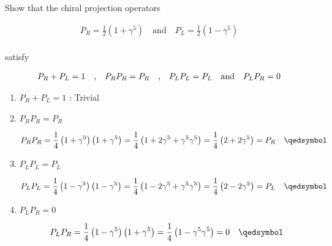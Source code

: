 
\begin{problem}{6.2}
    Show that the chiral projection operators 

    \begin{align*}
        P_R = \frac{1}{2}\left(1+\gamma^5\right) \quad \text{and} \quad P_L = \frac{1}{2}\left(1-\gamma^5\right)
    \end{align*}\\
    satisfy 

    \begin{align*}
        P_R + P_L = 1 \quad \text{,} \quad P_R P_R = P_R \quad \text{,} \quad P_L P_L = P_L \quad \text{and} \quad P_LP_R = 0 \\
    \end{align*}
\end{problem}
\begin{solution}
    \begin{enumerate}[label=(\alph*)]
        \item $ P_R + P_L = 1$ : Trivial 
        \item $ P_R P_R = P_R$ 
        
            \begin{align*}
                P_R P_R  = \frac{1}{4} \left(1+\gamma^5\right) \left(1+\gamma^5\right) &= \frac{1}{4} \left(1+2\gamma^5+\gamma^5\gamma^5\right) = \frac{1}{4} \left(2+2\gamma^5\right) = P_R \qed \\
            \end{align*}
        \item $ P_L P_L = P_L$ 
        
            \begin{align*}
                P_L P_L  = \frac{1}{4} \left(1-\gamma^5\right) \left(1-\gamma^5\right) &= \frac{1}{4} \left(1-2\gamma^5+\gamma^5\gamma^5\right) = \frac{1}{4} \left(2-2\gamma^5\right) = P_L \qed\\
            \end{align*}
        \item $ P_L P_R = 0$
        
            \begin{align*}
                P_L P_R  = \frac{1}{4} \left(1-\gamma^5\right) \left(1+\gamma^5\right) = \frac{1}{4} \left( 1- \gamma^5\gamma^5\right) = 0 \qed \\
            \end{align*}
    \end{enumerate}
\end{solution}

